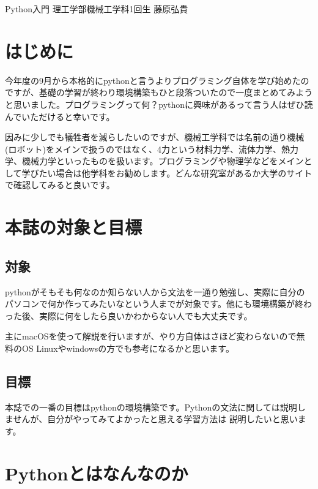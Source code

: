 \documentclass[10pt,b5paper,papersize,dvipdfmx]{jsbook}
\begin{document}


\kaishititle%
  {Python入門}%
  {理工学部機械工学科1回生}%
  {藤原弘貴}%

%
\section*{はじめに}
今年度の9月から本格的にpythonと言うよりプログラミング自体を学び始めたのですが、基礎の学習が終わり環境構築もひと段落ついたので一度まとめてみようと思いました。プログラミングって何？pythonに興味があるって言う人はぜひ読んでいただけると幸いです。\par
因みに少しでも犠牲者を減らしたいのですが、機械工学科では名前の通り機械(ロボット)をメインで扱うのではなく、4力という材料力学、流体力学、熱力学、機械力学といったものを扱います。プログラミングや物理学などをメインとして学びたい場合は他学科をお勧めします。どんな研究室があるか大学のサイトで確認してみると良いです。\par
%
\clearpage

\section{本誌の対象と目標}
\subsection{対象}
pythonがそもそも何なのか知らない人から文法を一通り勉強し、実際に自分のパソコンで何か作ってみたいなという人までが対象です。他にも環境構築が終わった後、実際に何をしたら良いかわからない人でも大丈夫です。\par
主にmacOSを使って解説を行いますが、やり方自体はさほど変わらないので無料のOS Linuxやwindowsの方でも参考になるかと思います。\par
\subsection{目標}
本誌での一番の目標はpythonの環境構築です。Pythonの文法に関しては説明しませんが、自分がやってみてよかったと思える学習方法は
説明したいと思います。\par
\section{Pythonとはなんなのか}
\end{document}
